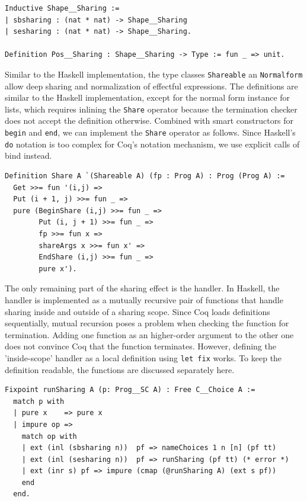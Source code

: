 \documentclass[a4paper, 11pt, fleqn, twoside]{scrreprt}
\newcommand{\hinl}[1]{\texttt{#1}}
\newcommand{\cinl}[1]{\texttt{#1}}
\begin{document}
\begin{verbatim}
Inductive Shape__Sharing :=
| sbsharing : (nat * nat) -> Shape__Sharing
| sesharing : (nat * nat) -> Shape__Sharing.

Definition Pos__Sharing : Shape__Sharing -> Type := fun _ => unit.
\end{verbatim}

Similar to the Haskell implementation, the type classes \cinl{Shareable} an \cinl{Normalform} allow deep sharing and normalization of effectful expressions.
The definitions are similar to the Haskell implementation, except for the normal form instance for lists, which requires inlining the \cinl{Share} operator because the termination checker does not accept the definition otherwise. 
Combined with smart constructors for \cinl{begin} and \cinl{end}, we can implement the \cinl{Share} operator as follows.
Since Haskell's \hinl{do} notation is too complex for Coq's notation mechanism, we use explicit calls of bind instead.

\begin{verbatim}
Definition Share A `(Shareable A) (fp : Prog A) : Prog (Prog A) :=
  Get >>= fun '(i,j) =>
  Put (i + 1, j) >>= fun _ =>
  pure (BeginShare (i,j) >>= fun _ =>
        Put (i, j + 1) >>= fun _ =>
        fp >>= fun x =>
        shareArgs x >>= fun x' =>
        EndShare (i,j) >>= fun _ =>
        pure x').
\end{verbatim}

The only remaining part of the sharing effect is the handler.
In Haskell, the handler is implemented as a mutually recursive pair of functions that handle sharing inside and outside of a sharing scope.
Since Coq loads definitions sequentially, mutual recursion poses a problem when checking the function for termination.
Adding one function as an higher-order argument to the other one does not convince Coq that the function terminates.
However, defining the 'inside-scope' handler as a local definition using \cinl{let fix} works.
To keep the definition readable, the functions are discussed separately here.

\begin{verbatim}
Fixpoint runSharing A (p: Prog__SC A) : Free C__Choice A :=
  match p with
  | pure x    => pure x
  | impure op =>
    match op with
    | ext (inl (sbsharing n))  pf => nameChoices 1 n [n] (pf tt)
    | ext (inl (sesharing n))  pf => runSharing (pf tt) (* error *)
    | ext (inr s) pf => impure (cmap (@runSharing A) (ext s pf))
    end
  end.
\end{verbatim}
\end{document}
